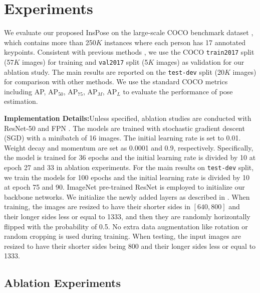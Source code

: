 \documentclass[sigconf]{acmart}
\begin{document}
\section{Experiments}
We evaluate our proposed InsPose on the large-scale COCO benchmark dataset \cite{lin2014microsoft}, which contains more than 250$K$ instances where each person has 17 annotated keypoints. Consistent with previous methods \cite{he2017mask, tian2019directpose, wei2020point}, we use the COCO \texttt{train2017} split (57$K$ images) for training and \texttt{val2017} split (5$K$ images) as validation for our ablation study. The main results are reported on the \texttt{test-dev} split (20$K$ images) for comparison with other methods.
We use the standard COCO metrics including AP, AP$_{50}$, AP$_{75}$, AP$_M$, AP$_L$ to evaluate the performance of pose estimation.

\textbf{Implementation Details:}\quad Unless specified, ablation studies are conducted with ResNet-50 \cite{he2016deep} and FPN \cite{lin2017feature}. 
The models are trained with stochastic gradient descent (SGD) with a minibatch of 16 images.
The initial learning rate is set to 0.01. Weight decay and momentum are set as 0.0001 and 0.9, respectively. Specifically, the model is trained for 36 epochs and the initial learning
rate is divided by 10 at epoch 27 and 33 in ablation experiments.
For the main results on \texttt{test-dev} split, we train the models for 100 epochs and the initial learning rate is divided by 10 at epoch 75 and 90.
ImageNet \cite{deng2009imagenet} pre-trained ResNet \cite{he2016deep} is employed to initialize our backbone networks. We initialize the newly added layers as described in \cite{lin2017focal}. When training, the images are resized to have their shorter sides in $[640, 800]$ and their longer sides less or equal to 1333, and then they are randomly horizontally flipped with the probability of 0.5. No extra data augmentation like rotation \cite{nie2019single} or random cropping \cite{tian2019directpose} is used during training. When testing, the input images are resized to have their shorter sides being 800 and their longer sides less or equal to 1333.


\subsection{Ablation Experiments}
\end{document}

